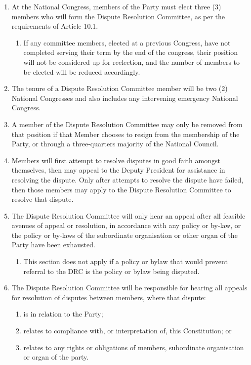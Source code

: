 \documentclass[a4paper,titlepage,8.5pt]{article}
\begin{document}
\begin{enumerate}
\item At the National Congress, members of the Party must elect three (3) members who will form the Dispute Resolution Committee, as per the requirements of Article 10.1.
\begin{enumerate}
    \item If any committee members, elected at a previous Congress, have not completed serving their term by the end of the congress, their position will not be considered up for reelection, and the number of members to be elected will be reduced accordingly.
\end{enumerate}
\item The tenure of a Dispute Resolution Committee member will be two (2) National Congresses and also includes any intervening emergency National Congress.
\item A member of the Dispute Resolution Committee may only be removed from that position if that Member chooses to resign from the membership of the Party, or through a three-quarters majority of the National Council.
\item Members will first attempt to resolve disputes in good faith amongst themselves, then may appeal to the Deputy President for assistance in resolving the dispute. Only after attempts to resolve the dispute have failed, then those members may apply to the Dispute Resolution Committee to resolve that dispute.
\item The Dispute Resolution Committee will only hear an appeal after all feasible avenues of appeal or resolution, in accordance with any policy or by-law, or the policy or by-laws of the subordinate organisation or other organ of the Party have been exhausted.
\begin{enumerate}
  \item This section does not apply if a policy or bylaw that would prevent referral to the DRC is the policy or bylaw being disputed.
\end{enumerate}
\item The Dispute Resolution Committee will be responsible for hearing all appeals for resolution of disputes between members, where that dispute:
\begin{enumerate}
\item is in relation to the Party;
\item relates to compliance with, or interpretation of, this Constitution; or
\item relates to any rights or obligations of members, subordinate organisation or organ of the party.

\end{enumerate}
\end{enumerate}
\end{document}
